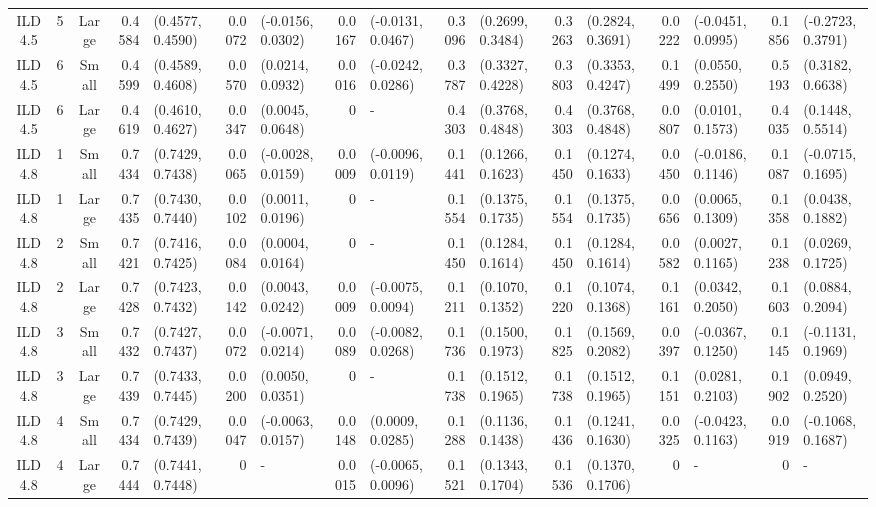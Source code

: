 \begin{landscape}
\begin{table}
\begin{tabular}{cccrlrlrlrlrlrlrl}
ILD4.5	&	5	&	Large	&	0.4584	&	(0.4577, 0.4590)	&	0.0072	&	(-0.0156, 0.0302)	&	0.0167	&	(-0.0131, 0.0467)	&	0.3096	&	(0.2699, 0.3484)	&	0.3263	&	(0.2824, 0.3691)	&	0.0222	&	(-0.0451, 0.0995)	&	0.1856	&	(-0.2723, 0.3791)	\\
ILD4.5	&	6	&	Small	&	0.4599	&	(0.4589, 0.4608)	&	0.0570	&	(0.0214, 0.0932)	&	0.0016	&	(-0.0242, 0.0286)	&	0.3787	&	(0.3327, 0.4228)	&	0.3803	&	(0.3353, 0.4247)	&	0.1499	&	(0.0550, 0.2550)	&	0.5193	&	(0.3182, 0.6638)	\\
ILD4.5	&	6	&	Large	&	0.4619	&	(0.4610, 0.4627)	&	0.0347	&	(0.0045, 0.0648)	&	0	&	-	&	0.4303	&	(0.3768, 0.4848)	&	0.4303	&	(0.3768, 0.4848)	&	0.0807	&	(0.0101, 0.1573)	&	0.4035	&	(0.1448, 0.5514)	\\
ILD4.8	&	1	&	Small	&	0.7434	&	(0.7429, 0.7438)	&	0.0065	&	(-0.0028, 0.0159)	&	0.0009	&	(-0.0096, 0.0119)	&	0.1441	&	(0.1266, 0.1623)	&	0.1450	&	(0.1274, 0.1633)	&	0.0450	&	(-0.0186, 0.1146)	&	0.1087	&	(-0.0715, 0.1695)	\\
ILD4.8	&	1	&	Large	&	0.7435	&	(0.7430, 0.7440)	&	0.0102	&	(0.0011, 0.0196)	&	0	&	-	&	0.1554	&	(0.1375, 0.1735)	&	0.1554	&	(0.1375, 0.1735)	&	0.0656	&	(0.0065, 0.1309)	&	0.1358	&	(0.0438, 0.1882)	\\
ILD4.8	&	2	&	Small	&	0.7421	&	(0.7416, 0.7425)	&	0.0084	&	(0.0004, 0.0164)	&	0	&	-	&	0.1450	&	(0.1284, 0.1614)	&	0.1450	&	(0.1284, 0.1614)	&	0.0582	&	(0.0027, 0.1165)	&	0.1238	&	(0.0269, 0.1725)	\\
ILD4.8	&	2	&	Large	&	0.7428	&	(0.7423, 0.7432)	&	0.0142	&	(0.0043, 0.0242)	&	0.0009	&	(-0.0075, 0.0094)	&	0.1211	&	(0.1070, 0.1352)	&	0.1220	&	(0.1074, 0.1368)	&	0.1161	&	(0.0342, 0.2050)	&	0.1603	&	(0.0884, 0.2094)	\\
ILD4.8	&	3	&	Small	&	0.7432	&	(0.7427, 0.7437)	&	0.0072	&	(-0.0071, 0.0214)	&	0.0089	&	(-0.0082, 0.0268)	&	0.1736	&	(0.1500, 0.1973)	&	0.1825	&	(0.1569, 0.2082)	&	0.0397	&	(-0.0367, 0.1250)	&	0.1145	&	(-0.1131, 0.1969)	\\
ILD4.8	&	3	&	Large	&	0.7439	&	(0.7433, 0.7445)	&	0.0200	&	(0.0050, 0.0351)	&	0	&	-	&	0.1738	&	(0.1512, 0.1965)	&	0.1738	&	(0.1512, 0.1965)	&	0.1151	&	(0.0281, 0.2103)	&	0.1902	&	(0.0949, 0.2520)	\\
ILD4.8	&	4	&	Small	&	0.7434	&	(0.7429, 0.7439)	&	0.0047	&	(-0.0063, 0.0157)	&	0.0148	&	(0.0009, 0.0285)	&	0.1288	&	(0.1136, 0.1438)	&	0.1436	&	(0.1241, 0.1630)	&	0.0325	&	(-0.0423, 0.1163)	&	0.0919	&	(-0.1068, 0.1687)	\\
ILD4.8	&	4	&	Large	&	0.7444	&	(0.7441, 0.7448)	&	0	&	-	&	0.0015	&	(-0.0065, 0.0096)	&	0.1521	&	(0.1343, 0.1704)	&	0.1536	&	(0.1370, 0.1706)	&	0	&	-	&	0	&	-	\\

\end{tabular}
\end{table}
\end{landscape}
